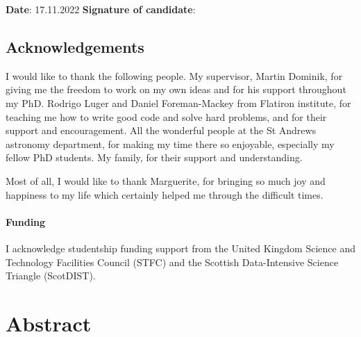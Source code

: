 \documentclass[12pt,dvipsnames]{report}
\begin{document}
\vspace{1cm}
\noindent \textbf{Date}: 17.11.2022 \quad\quad \textbf{Signature of candidate}: 
\newpage 

\section*{Acknowledgements}
I would like to thank the following people. My supervisor, Martin Dominik, for giving me the freedom to work 
on my own ideas and for his support throughout my PhD. 
Rodrigo Luger and Daniel Foreman-Mackey from Flatiron institute, for teaching me how 
to write good code and solve hard problems, and for their support and encouragement.
All the wonderful people at the St Andrews astronomy department,
for making my time there so enjoyable, especially my fellow PhD students.
My family, for their support and understanding.

Most of all, I would like to thank Marguerite, for bringing so much joy and happiness to 
my life which certainly helped me through the difficult times.
\newpage
\subsubsection{Funding}
I acknowledge studentship funding support from the United Kingdom Science and Technology 
Facilities Council (STFC) and the Scottish Data-Intensive Science Triangle (ScotDIST).


\tableofcontents
\listoffigures
\listoftables

\chapter*{Abstract}
\end{document}
